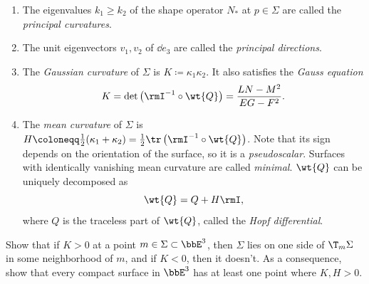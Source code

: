 \begin{defn}
    \begin{enumerate}
        \item The eigenvalues $k_1\geq k_2$ of the shape operator $N_\ast$ at $p\in \Sigma$ are called the \emph{principal curvatures}.
        \item The unit eigenvectors $v_1,v_2$ of $\dd e_3$ are called the \emph{principal directions}.
        \item The \emph{Gaussian curvature} of $\Sigma$ is $K\coloneqq \kappa_1\kappa_2$. It also satisfies the \emph{Gauss equation}
        \[K=\det\left(\rmI^{-1}\circ \wt{Q}\right)=\frac{LN-M^2}{EG-F^2}.\]
        \item The \emph{mean curvature} of $\Sigma$ is $H\coloneqq \frac12(\kappa_1+\kappa_2)=\frac12\tr\left(\rmI^{-1}\circ \wt{Q}\right)$. Note that its sign depends on the orientation of the surface, so it is a \emph{pseudoscalar}. Surfaces with identically vanishing mean curvature are called \emph{minimal}. $\wt{Q}$ can be uniquely decomposed as
        \[\wt{Q}=Q+H\rmI,\]
        where $Q$ is the traceless part of $\wt{Q}$, called the \emph{Hopf differential}.
    \end{enumerate}
\end{defn}

\begin{xca}
    Show that if $K>0$ at a point $m\in \Sigma\subset \bbE^3$, then $\Sigma$ lies on one side of $\T_m\Sigma$ in some neighborhood of $m$, and if $K<0$, then it doesn't. As a consequence, show that every compact surface in $\bbE^3$ has at least one point where $K,H>0$.
\end{xca}

